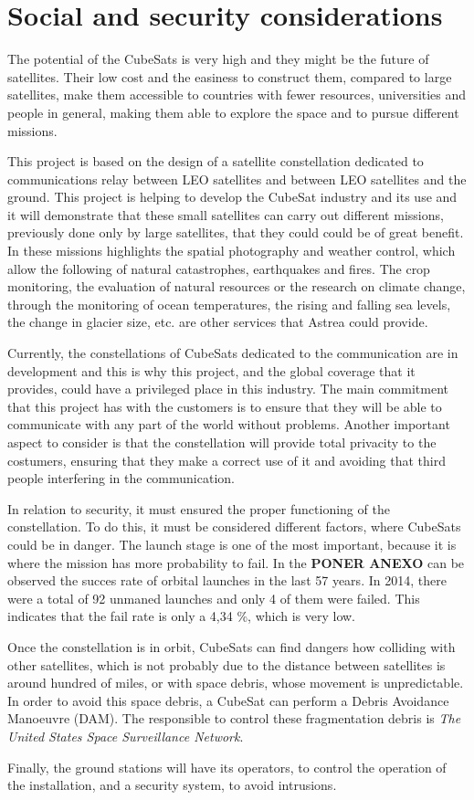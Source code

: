 \chapter{Social and security considerations}

The potential of the CubeSats is very high and they might be the future of satellites. Their low cost and the easiness to construct them, compared to large satellites, make them accessible to countries with fewer resources, universities and people in general, making them able to explore the space and to pursue different missions.

This project is based on the design of a satellite constellation dedicated to communications relay between LEO satellites and between LEO satellites and the ground. This project is helping to develop the CubeSat industry and its use and it will demonstrate that these small satellites can carry out different missions, previously done only by large satellites, that they could could be of great benefit. In these missions highlights the spatial photography and weather control, which allow the following of natural catastrophes, earthquakes and fires. The crop monitoring, the evaluation of natural resources or the research on climate change, through the monitoring of ocean temperatures, the rising and falling sea levels, the change in glacier size, etc. are other services that Astrea could provide. 

Currently, the constellations of CubeSats dedicated to the communication are in development and this is why this project, and the global coverage that it provides, could have a privileged place in this industry. The main commitment that this project has with the customers is to ensure that they will be able to communicate with any part of the world without problems. Another important aspect to consider is that the constellation will provide total privacity  to the costumers, ensuring that they make a correct use of it and avoiding that third people interfering in the communication. 

In relation to security, it must ensured the proper functioning of the constellation. To do this, it must be considered different factors, where CubeSats could be in danger. The launch stage is one of the most important, because it is where the mission has more probability to fail. In the \textbf{PONER ANEXO} can be observed the succes rate of orbital launches in the last 57 years. In 2014, there were a total of 92 unmaned launches and only 4 of them were failed. This indicates that the fail rate is only a 4,34 \%, which is very low. 

Once the constellation is in orbit, CubeSats can find dangers how colliding with other satellites, which is not probably due to the distance between satellites is around hundred of miles, or with space debris, whose movement is unpredictable. In order to avoid this space debris, a CubeSat can perform a Debris Avoidance Manoeuvre (DAM). The responsible to control these fragmentation debris is \textit{The United States Space Surveillance Network}.

Finally, the ground stations will have its operators, to control the operation of the installation, and a security system, to avoid intrusions.